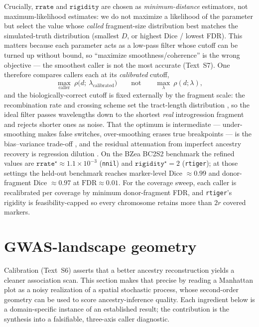 \documentclass[11pt]{article}
\providecommand{\nnil}{\texttt{nnil}\xspace}
\providecommand{\rtiger}{\texttt{rtiger}\xspace}
\begin{document}
Crucially, $\texttt{rrate}$ and $\texttt{rigidity}$ are chosen as
\emph{minimum-distance} estimators, not maximum-likelihood estimates: we do not
maximize a likelihood of the parameter but select the value whose \emph{called}
fragment-size distribution best matches the simulated-truth distribution (smallest
$D$, or highest Dice / lowest FDR). This matters because each parameter acts as a
low-pass filter whose cutoff can be turned up without bound, so ``maximize
smoothness/coherence'' is the wrong objective --- the smoothest caller is not the most
accurate (Text~S7). One therefore compares callers each at its \emph{calibrated}
cutoff,
\begin{equation}
\max_{\text{caller}}\ \rho\big(d;\ \lambda_{\text{calibrated}}\big)
\qquad\text{not}\qquad
\max_{\lambda}\ \rho(d;\lambda),
\label{eq:calib-not-max}
\end{equation}
and the biologically-correct cutoff is fixed externally by the fragment scale: the
recombination rate and crossing scheme set the tract-length distribution
\citep{fisher_1954,gravel_2012,liang_nielsen_2014}, so the ideal filter passes
wavelengths down to the shortest \emph{real} introgression fragment and rejects
shorter ones as noise. That the optimum is intermediate --- under-smoothing makes
false switches, over-smoothing erases true breakpoints --- is the bias--variance
trade-off \citep{geman_1992}, and the residual attenuation from imperfect ancestry
recovery is regression dilution \citep{frost_thompson_2000}. On the BZea BC2S2
benchmark the refined values are $\texttt{rrate}^\star\approx1.1\times10^{-3}$ (\nnil)
and $\texttt{rigidity}^\star=2$ (\rtiger); at those settings the held-out benchmark
reaches marker-level Dice $\approx0.99$ and donor-fragment Dice $\approx0.97$ at
$\mathrm{FDR}\approx0.01$. For the coverage sweep, each caller is recalibrated per
coverage by minimum donor-fragment FDR, and \rtiger's rigidity is feasibility-capped
so every chromosome retains more than $2r$ covered markers.

\section{GWAS-landscape geometry}
\label{sec:gwas-geometry}

Calibration (Text~S6) asserts that a better ancestry reconstruction yields a cleaner
association scan. This section makes that precise by reading a Manhattan plot as a
noisy realization of a spatial stochastic process, whose second-order geometry can
be used to score ancestry-inference quality. Each ingredient below is a
domain-specific instance of an established result; the contribution is the synthesis
into a falsifiable, three-axis caller diagnostic.
\end{document}
